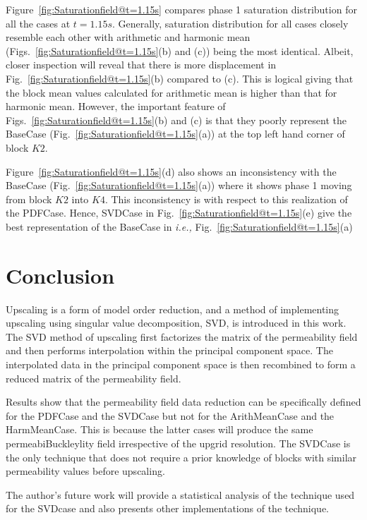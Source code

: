 \documentclass[preprint,12pt]{elsarticle}
\newcommand{\ie}{{\it i.e., }}
\begin{document}
Figure~\ref{fig:Saturationfield@t=1.15s} compares phase 1 saturation distribution for all the cases at $t=1.15s$. Generally, saturation distribution for all cases closely resemble each other with arithmetic and harmonic mean (Figs.~\ref{fig:Saturationfield@t=1.15s}(b) and (c)) being the most identical. Albeit, closer inspection will reveal that there is more displacement in Fig.~\ref{fig:Saturationfield@t=1.15s}(b) compared to (c). This is logical giving that the block mean values calculated for arithmetic mean is higher than that for harmonic mean. However, the important feature of Figs.~\ref{fig:Saturationfield@t=1.15s}(b) and (c) is that they poorly represent the BaseCase (Fig.~\ref{fig:Saturationfield@t=1.15s}(a)) at the top left hand corner of block $K2$.

Figure~\ref{fig:Saturationfield@t=1.15s}(d) also shows an inconsistency with the BaseCase (Fig.~\ref{fig:Saturationfield@t=1.15s}(a)) where it shows phase 1 moving from block $K2$ into $K4$. This inconsistency is with respect to this realization of the PDFCase. Hence, SVDCase in Fig.~\ref{fig:Saturationfield@t=1.15s}(e) give the best representation of the BaseCase in \ie Fig.~\ref{fig:Saturationfield@t=1.15s}(a)

\section{Conclusion}\label{section:conclusion}

Upscaling is a form of model order reduction, and a method of implementing upscaling using singular value decomposition, SVD, is introduced in this work. The SVD method of upscaling first factorizes the matrix of the permeability field and then performs interpolation within the principal component space. The interpolated data in the principal component space is then recombined to form a reduced matrix of the permeability field.

Results show that the permeability field data reduction can be specifically defined for the PDFCase and the SVDCase but not for the ArithMeanCase and the HarmMeanCase. This is because the latter cases will produce the same permeabiBuckleylity field irrespective of the upgrid resolution. The SVDCase is the only technique that does not require a prior knowledge of blocks with similar permeability values before upscaling.

The author's future work will provide a statistical analysis of the technique used for the SVDcase and also presents other implementations of the technique.
\end{document}
